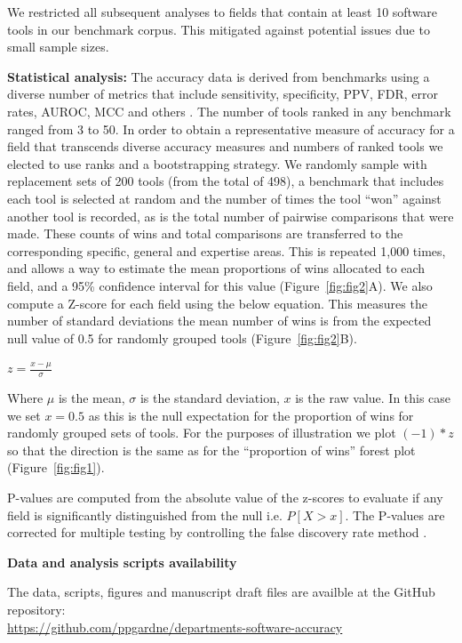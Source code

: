 \documentclass[fleqn,10pt,doc,onecolumn]{SelfArx}%
\begin{document}
We restricted all subsequent analyses to fields that contain at least 10
software tools in our benchmark corpus. This mitigated against
potential issues due to small sample sizes. 

\textbf{Statistical analysis:} The accuracy data is derived from
benchmarks using a diverse number of metrics that include sensitivity,
specificity, PPV, FDR, error rates, AUROC, MCC and others
\cite{weber2019essential}. The number of tools ranked in any benchmark
ranged from 3 to 50. In order to obtain a representative measure of
accuracy for a field that transcends diverse accuracy measures and
numbers of ranked tools we elected to use ranks and a
bootstrapping strategy.  We randomly sample with replacement sets of
200 tools (from the total of 498), a benchmark that includes each tool
is selected at random and the number of times the tool ``won'' against
another tool is recorded, as is the total number of pairwise
comparisons that were made. These counts of wins and total comparisons
are transferred to the corresponding specific, general and expertise
areas. This is repeated 1,000 times, and allows a way to estimate the
mean proportions of wins allocated to each field, and a 95\%
confidence interval for this value (Figure~\ref{fig:fig2}A). We also compute a
Z-score for each field using the below equation. This measures the
number of standard deviations the mean number of wins is from the
expected null value of 0.5 for randomly grouped tools
(Figure~\ref{fig:fig2}B).

$z=\frac{x-\mu}{\sigma}$




Where $\mu$ is the mean, $\sigma$ is the standard deviation, $x$ is the raw
value. In this case we set $x=0.5$ as this is the null expectation for
the proportion of wins for randomly grouped sets of tools. For the
purposes of illustration we plot $(-1)*z$ so that the direction is the
same as for the ``proportion of wins'' forest plot
(Figure~\ref{fig:fig1}). 

P-values are computed from the absolute value of the z-scores to
evaluate if any field is significantly distinguished from the null
i.e. $P[X > x]$. The P-values are corrected for multiple testing by
controlling the false discovery rate method
\cite{benjamini1995controlling}.


\noindent\textbf{Data and analysis scripts availability}

The data, scripts, figures and manuscript draft files are availble at the GitHub repository:\\
\href{https://github.com/ppgardne/departments-software-accuracy}{https://github.com/ppgardne/departments-software-accuracy}
\end{document}
